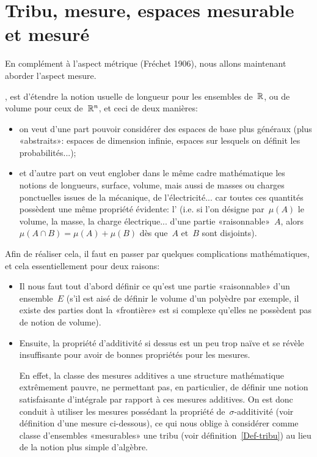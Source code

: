 
\medskip
\section{Tribu, mesure, espaces mesurable et mesuré}

En complément à l'aspect métrique (Fréchet 1906), nous allons maintenant aborder l'aspect mesure.

\medskip
{}, est d'étendre la notion usuelle de longueur pour les ensembles de~$\mathbb R$, ou de volume pour ceux de~$\mathbb R^n$, et ceci de deux manières:
\begin{itemize}
\item on veut d'une part pouvoir considérer des espaces de base plus généraux (plus «abstraits»: espaces de dimension infinie, espaces sur lesquels on définit les probabilités...); 
\item et d'autre part on veut englober dans le même cadre mathématique les notions de longueurs, surface, volume, mais aussi de masses ou charges ponctuelles issues de la mécanique, de l'électricité... car toutes ces quantités possèdent une même propriété évidente: l' (i.e. si l'on désigne par~$\mu(A)$ le volume, la masse, la charge électrique... d'une partie «raisonnable»~$A$, alors~$\mu(A\cap B)=\mu(A)+\mu(B)$ dès que~$A$ et~$B$ sont disjoints).
\end{itemize}

\medskip
Afin de réaliser cela, il faut en passer par quelques complications mathématiques, et cela essentiellement pour deux raisons:
\begin{itemize}
   \item Il nous faut tout d'abord définir ce qu'est une partie «raisonnable» d'un ensemble~$E$ (s'il est aisé de définir le volume d'un polyèdre par exemple, il existe des parties dont la «frontière» est si complexe qu'elles ne possèdent pas de notion de volume).

   \item Ensuite, la propriété d'additivité si dessus est un peu trop naïve et se révèle insuffisante pour avoir de bonnes propriétés pour les mesures.

En effet, la classe des mesures additives a une structure mathématique extrêmement pauvre, ne permettant pas, en particulier, de définir une notion satisfaisante d'intégrale par rapport à ces mesures additives.
On est donc conduit à utiliser les mesures possédant la propriété de~$\sigma$-additivité (voir définition d'une mesure ci-dessous), ce qui nous oblige à considérer comme classe d'ensembles «mesurables» une tribu (voir définition~\ref{Def-tribu}) au lieu de la notion plus simple d'algèbre.
\end{itemize}

